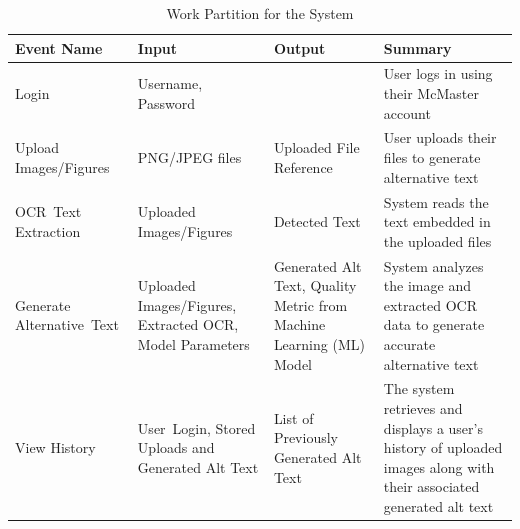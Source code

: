\documentclass[12pt]{article}
\begin{document}
\begin{table}[H]
  \centering
  \caption{Work Partition for the System}
  \label{tab:work-partition}
  \begin{tabular}{ |p{3cm}|p{3cm}|p{3cm}|p{4cm}| }
    \hline
    \textbf{Event Name} & \textbf{Input} & \textbf{Output} & \textbf{Summary} \\
    \hline
    Login & Username, Password & & User logs in using their McMaster account \\
    \hline
    Upload  \mbox{Images/Figures} & PNG/JPEG files & Uploaded File Reference & User uploads their files to generate alternative text \\
    \hline
    \mbox{OCR Text} \mbox{Extraction} & Uploaded \mbox{Images/Figures} & Detected Text & System reads the text embedded in the uploaded files \\
    \hline
    Generate \mbox{Alternative Text} & Uploaded  \mbox{Images/Figures}, Extracted OCR, Model Parameters & Generated Alt Text, Quality Metric from Machine Learning (ML) Model & System analyzes the image and extracted OCR data to generate accurate alternative text \\
    \hline
    View History & \mbox{User Login,} Stored Uploads and Generated Alt Text & List of Previously Generated Alt Text & The system retrieves and displays a user’s history of uploaded images along with their associated generated alt text \\
    \hline
  \end{tabular}
\end{table}
\end{document}
